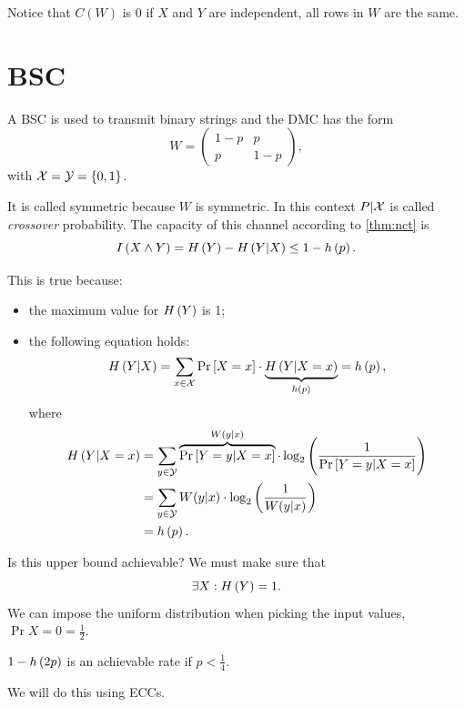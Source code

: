 Notice that $C(W)$ is 0 if $X$ and $Y$ are independent, \ie all rows in $W$ are the same. 

\section{\acl{BSC}}

A \ac{BSC} is used to transmit binary strings and the \ac{DMC} has the form
\begin{equation*}
	W = 
	\begin{pmatrix}
		1-p & p \\
		p & 1-p
	\end{pmatrix},
\end{equation*}
with $\mathcal{X} = \mathcal{Y} = \{0,1\}$.

It is called symmetric because $W$ is symmetric.
In this context $P|\mathcal{X}$ is called \emph{crossover} probability.
The capacity of this channel according to \cref{thm:nct} is
\begin{equation*}
	I \left( {X \wedge Y} \right)
	=
	H\left({Y}\right) - H\left({Y|X}\right)
	\le
	1 - h\left({p}\right).
\end{equation*}

This is true because:
\begin{itemize}
	\item the maximum value for $H\left({Y}\right)$ is 1;
	\item the following equation holds:
		\begin{equation*}
			H\left({Y | X}\right) =
			\sum_{x \in \mathcal{X}} \mathop{\mathrm{Pr}}\limits_{} \left[ {X = x} \right] \cdot \underbrace{H\left({Y | X = x}\right)}_{h\left({p}\right)} =
			h\left({p}\right),
		\end{equation*}
		where
		\begin{align*}
			H\left({Y | X = x}\right)
			& =
			\sum_{y \in \mathcal{Y}} \overbrace{\mathop{\mathrm{Pr}}\limits_{} \left[ {Y = y | X = x} \right]}^{W(y|x)} \cdot
			\log_2 \left( {\frac{1}{\mathop{\mathrm{Pr}}\limits_{} \left[ {Y = y | X = x} \right]}} \right)
			\\
			& =
			\sum_{y \in \mathcal{Y}} W(y | x) \cdot \log_2 \left( {\frac{1}{W(y | x)}} \right)
			\\
			& =
			h\left({p}\right).
		\end{align*}
\end{itemize} 

Is this upper bound achievable? We must make sure that
\begin{equation*}
	\exists X : H\left({Y}\right) = 1.
\end{equation*}
We can impose the uniform distribution when picking the input values, \ie $\Pr{X = 0} = \frac{1}{2}$.

\begin{obs}
	$1-h\left({2p}\right)$ is an achievable rate if $p < \frac{1}{4}$.
\end{obs}
We will do this using \acp{ECC}.

